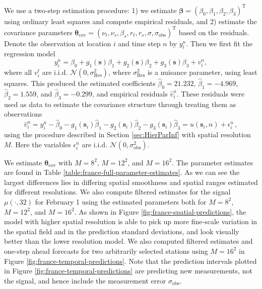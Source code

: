 \documentclass[12pt]{article} %
\begin{document}
We use a two-step estimation procedure: 1) we estimate $\boldsymbol{\beta} = (\beta_0, \beta_1, \beta_2, \beta_3)^\mathrm{T}$ using ordinary least squares and compute empirical residuals, and 2) estimate the covariance 
parameters $\boldsymbol{\theta}_{\mathrm{cov}}=(\nu_t, \nu_s, \beta_s, r_t, r_s, \sigma, \sigma_{\mathrm{obs}})^\mathrm{T}$ based on the residuals. 
Denote the observation at location $i$ and time step $n$ by $y_i^n$. Then we first fit the regression model
%
$$y_{i}^n = \beta_{0} + g_1(\boldsymbol{s})\beta_1 + g_2(\boldsymbol{s})\beta_2 + g_3(\boldsymbol{s})\beta_3  + v_i^n,$$
%
where all $v_i^t$ are i.i.d. $\mathcal{N}(0, \sigma_{\mathrm{Res}}^2)$, where $\sigma_{\mathrm{Res}}^2$ is a nuisance parameter, using least squares. This produced the estimated coefficients $\hat{\beta}_0 = 21.232$, $\hat{\beta}_1 = -4.969$, $\hat{\beta}_2 = 1.559$, and $\hat{\beta}_3 = -0.299$, and empirical residuals $\hat{v}_i^n$.
These residuals were used as data to estimate the covariance structure through treating them as observations
$$\hat{v}_i^n = y^n_i-\hat{\beta}_0-g_1(\boldsymbol{s}_i)\hat{\beta}_1-g_2(\boldsymbol{s}_i)\hat{\beta}_2-g_3(\boldsymbol{s}_i)\hat{\beta}_3=u(\boldsymbol{s}_i, n) + \epsilon_{i}^n \, ,$$
using the procedure described in Section \ref{sec:HierParInf} with spatial resolution $M$. Here the variables $\epsilon_i^n$ are i.i.d. $\mathcal{N}(0, \sigma_{\mathrm{obs}}^2)$.

We estimate $\boldsymbol{\theta}_{\mathrm{cov}}$ with $M = 8^2$, $M = 12^2$, and $M = 16^2$. The parameter estimates are found in Table \ref{table:france-full-parameter-estimates}. As we can see the largest differences lies in differing spatial smoothness and spatial ranges estimated for different resolutions. We also compute filtered estimates for the signal $\mu(\cdot, 32)$ for February 1 using the estimated parameters both for $M = 8^2$, $M = 12^2$, and $M = 16^2$. As shown in Figure \ref{fig:france-spatial-predictions}, the model with higher spatial resolution is able to pick up more fine-scale variation in the spatial field and in the prediction standard deviations, and look visually better than the lower resolution model. We also computed filtered estimates and one-step ahead forecasts for two arbitrarily selected stations using $M = 16^2$ in Figure \ref{fig:france-temporal-predictions}. Note that the prediction intervals plotted in Figure \ref{fig:france-temporal-predictions} are predicting new measurements, not the signal, and hence include the measurement error $\sigma_{\mathrm{obs}}$. 
\end{document}
